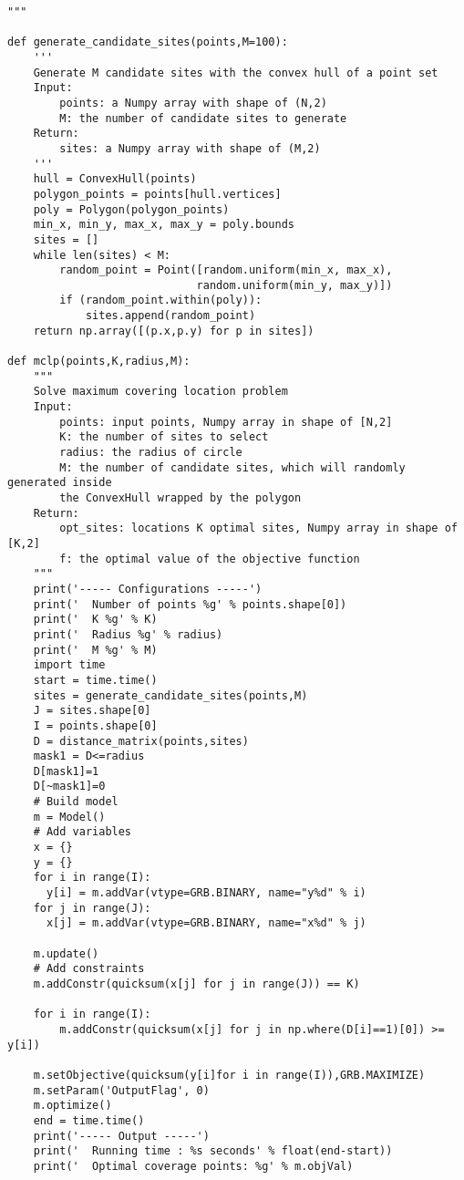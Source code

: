 \begin{singlespace}
\begin{verbatim}
"""

def generate_candidate_sites(points,M=100):
    '''
    Generate M candidate sites with the convex hull of a point set
    Input:
        points: a Numpy array with shape of (N,2)
        M: the number of candidate sites to generate
    Return:
        sites: a Numpy array with shape of (M,2)
    '''
    hull = ConvexHull(points)
    polygon_points = points[hull.vertices]
    poly = Polygon(polygon_points)
    min_x, min_y, max_x, max_y = poly.bounds
    sites = []
    while len(sites) < M:
        random_point = Point([random.uniform(min_x, max_x),
                             random.uniform(min_y, max_y)])
        if (random_point.within(poly)):
            sites.append(random_point)
    return np.array([(p.x,p.y) for p in sites])
 
def mclp(points,K,radius,M):
    """
    Solve maximum covering location problem
    Input:
        points: input points, Numpy array in shape of [N,2]
        K: the number of sites to select
        radius: the radius of circle
        M: the number of candidate sites, which will randomly generated inside
        the ConvexHull wrapped by the polygon
    Return:
        opt_sites: locations K optimal sites, Numpy array in shape of [K,2]
        f: the optimal value of the objective function
    """
    print('----- Configurations -----')
    print('  Number of points %g' % points.shape[0])
    print('  K %g' % K)
    print('  Radius %g' % radius)
    print('  M %g' % M)
    import time
    start = time.time()
    sites = generate_candidate_sites(points,M)
    J = sites.shape[0]
    I = points.shape[0]
    D = distance_matrix(points,sites)
    mask1 = D<=radius
    D[mask1]=1
    D[~mask1]=0
    # Build model
    m = Model()
    # Add variables
    x = {}
    y = {}
    for i in range(I):
      y[i] = m.addVar(vtype=GRB.BINARY, name="y%d" % i)
    for j in range(J):
      x[j] = m.addVar(vtype=GRB.BINARY, name="x%d" % j)
 
    m.update()
    # Add constraints
    m.addConstr(quicksum(x[j] for j in range(J)) == K)
 
    for i in range(I):
        m.addConstr(quicksum(x[j] for j in np.where(D[i]==1)[0]) >= y[i])
 
    m.setObjective(quicksum(y[i]for i in range(I)),GRB.MAXIMIZE)
    m.setParam('OutputFlag', 0)
    m.optimize()
    end = time.time()
    print('----- Output -----')
    print('  Running time : %s seconds' % float(end-start))
    print('  Optimal coverage points: %g' % m.objVal)
    

\end{verbatim}
\end{singlespace}
